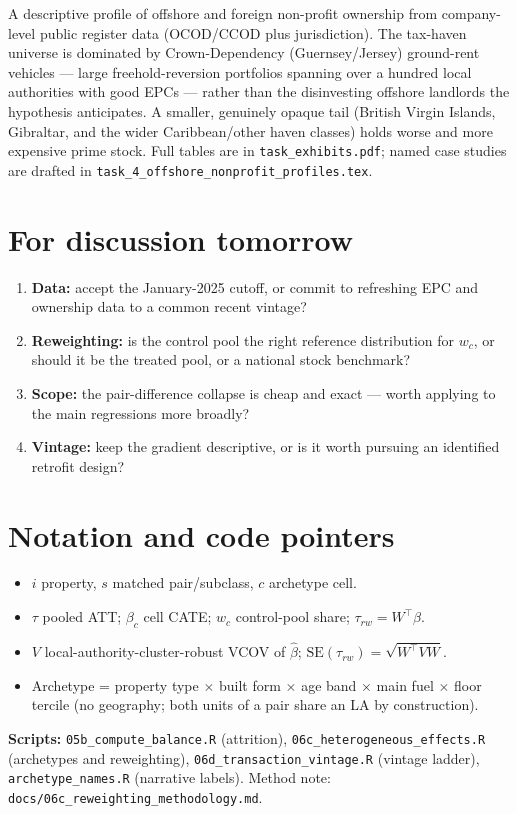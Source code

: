 \documentclass[11pt]{article}
\begin{document}
A descriptive profile of offshore and foreign non-profit ownership from company-level
public register data (OCOD/CCOD plus jurisdiction). The tax-haven universe is
dominated by Crown-Dependency (Guernsey/Jersey) ground-rent vehicles --- large
freehold-reversion portfolios spanning over a hundred local authorities with good
EPCs --- rather than the disinvesting offshore landlords the hypothesis anticipates.
A smaller, genuinely opaque tail (British Virgin Islands, Gibraltar, and the wider
Caribbean/other haven classes) holds worse and more expensive prime stock. Full
tables are in \texttt{task\_exhibits.pdf}; named case studies are drafted in
\texttt{task\_4\_offshore\_nonprofit\_profiles.tex}.

\section{For discussion tomorrow}
\begin{enumerate}
  \item \textbf{Data:} accept the January-2025 cutoff, or commit to refreshing EPC and
        ownership data to a common recent vintage?
  \item \textbf{Reweighting:} is the control pool the right reference distribution for
        $w_c$, or should it be the treated pool, or a national stock benchmark?
  \item \textbf{Scope:} the pair-difference collapse is cheap and exact --- worth
        applying to the main regressions more broadly?
  \item \textbf{Vintage:} keep the gradient descriptive, or is it worth pursuing an
        identified retrofit design?
\end{enumerate}

\appendix
\section{Notation and code pointers}
\begin{itemize}
  \item $i$ property, $s$ matched pair/subclass, $c$ archetype cell.
  \item $\tau$ pooled ATT; $\beta_c$ cell CATE; $w_c$ control-pool share;
        $\tau_{rw} = W^\top\beta$.
  \item $V$ local-authority-cluster-robust VCOV of $\hat\beta$;
        $\mathrm{SE}(\tau_{rw}) = \sqrt{W^\top V W}$.
  \item Archetype = property type $\times$ built form $\times$ age band $\times$ main
        fuel $\times$ floor tercile (no geography; both units of a pair share an LA
        by construction).
\end{itemize}
\textbf{Scripts:} \texttt{05b\_compute\_balance.R} (attrition),
\texttt{06c\_heterogeneous\_effects.R} (archetypes and reweighting),
\texttt{06d\_transaction\_vintage.R} (vintage ladder),
\texttt{archetype\_names.R} (narrative labels). Method note:
\texttt{docs/06c\_reweighting\_methodology.md}.
\end{document}
